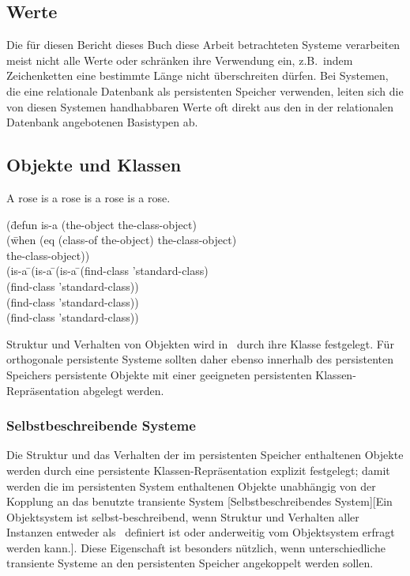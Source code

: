 \subsection{Werte}%
%
Die f\"{u}r \ifbericht diesen Bericht \else\ifbuch dieses Buch \else
diese Arbeit \fi\fi betrachteten Systeme verarbeiten meist nicht alle
Werte oder schr\"{a}nken ihre Verwendung ein, z.B.\ indem
Zeichenketten eine bestimmte L\"{a}nge nicht \"{u}berschreiten
d\"{u}rfen.  Bei Systemen, die eine relationale Datenbank als
persistenten Speicher verwenden, leiten sich die von diesen Systemen
handhabbaren Werte oft direkt aus den in der relationalen Datenbank
angebotenen Basistypen ab.
%
\subsection{Objekte und Klassen}%
\label{sec:ocls}%
%
\begin{fortune}%
A rose is a rose is a rose is a rose.
\begin{tt}%
\begin{tabbing}%
(d\={}efun is-a (the-object the-class-object)\\
  \>{}(w\={}hen (eq (class-of the-object) the-class-object)\\
  \>    \>{}the-class-object))\\[\smallskipamount]
(is-a \={}(is-a \={}(is-a \={}(find-class 'standard-class)\\
      \>{}      \>{}      \>{}(find-class 'standard-class))\\
      \>{}      \>{}(find-class 'standard-class))\\
      \>{}(find-class 'standard-class))
\end{tabbing}%
\end{tt}%
\fromwonl{\clos}%
\end{fortune}%
%
Struktur und Verhalten von Objekten wird in \clos\ durch ihre
Klasse festgelegt. F\"{u}r orthogonale persistente Systeme sollten daher
ebenso innerhalb des persistenten Speichers persistente Objekte mit
einer geeigneten persistenten Klassen-Repr\"{a}sentation abgelegt werden.
%
\subsubsection{Selbstbeschreibende Systeme}
%
Die Struktur und das Verhalten der im persistenten Speicher
enthaltenen Objekte werden durch eine persistente Klassen-Repr\"{a}sentation
explizit festgelegt; damit werden die im persistenten System
enthaltenen Objekte unabh\"{a}ngig von der Kopplung an das benutzte
transiente System
[Selbstbeschreibendes
System][{Ein Objektsystem ist selbst-be\-schrei\-bend, wenn Struktur
und Verhalten aller Instanzen entweder als
\protect{}\
definiert ist oder anderweitig vom Objektsystem erfragt
werden kann.}]. Diese Eigenschaft ist besonders n\"{u}tzlich, wenn
unterschiedliche transiente Systeme an den persistenten Speicher
angekoppelt werden sollen.
%
